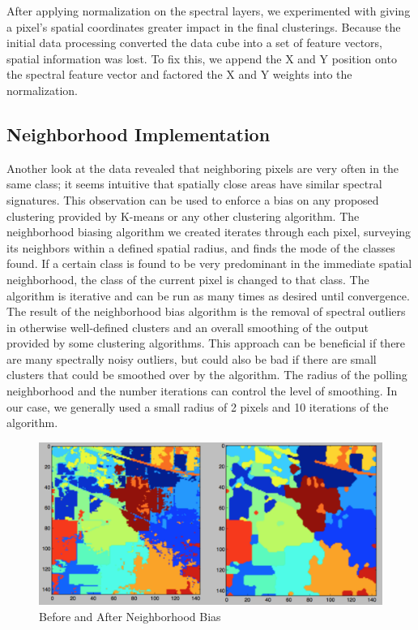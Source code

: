 \documentclass[journal]{IEEEtran}
\begin{document}
    After applying normalization on the spectral layers, we experimented with giving a pixel’s spatial coordinates greater impact in the final clusterings. Because the initial data processing converted the data cube into a set of feature vectors, spatial information was lost. To fix this, we append the X and Y position onto the spectral feature vector and factored the X and Y weights into the normalization.\\

  \subsection{Neighborhood Implementation}
    Another look at the data revealed that neighboring pixels are very often in the same class; it seems intuitive that spatially close areas have similar spectral signatures.  This observation can be used to enforce a bias on any proposed clustering provided by K-means or any other clustering algorithm. The neighborhood biasing algorithm we created iterates through each pixel, surveying its neighbors within a defined spatial radius, and finds the mode of the classes found.  If a certain class is found to be very predominant in the immediate spatial neighborhood, the class of the current pixel is changed to that class.  The algorithm is iterative and can be run as many times as desired until convergence.  The result of the neighborhood bias algorithm is the removal of spectral outliers in otherwise well-defined clusters and an overall smoothing of the output provided by some clustering algorithms. This approach can be beneficial if there are many spectrally noisy outliers, but could also be bad if there are small clusters that could be smoothed over by the algorithm. The radius of the polling neighborhood and the number iterations can control the level of smoothing. In our case, we generally used a small radius of 2 pixels and 10 iterations of the algorithm.\\

    \begin{figure}[h!]
      \centering\includegraphics[width=\columnwidth]{images/BandUnB.png}
      \caption{Before and After Neighborhood Bias}
      \label{fig:NeighborhoodBias}
    \end{figure}
\end{document}
